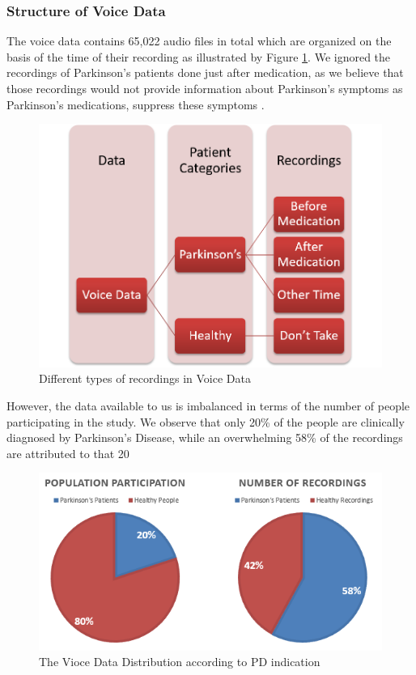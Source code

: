 \subsubsection{Structure of Voice Data}
The voice data contains 65,022 audio files in total which are organized on the basis of the time of their recording as illustrated by Figure \ref{fig:park_time}. We ignored the recordings of Parkinson's patients done just after medication, as we believe that those recordings would not provide information about Parkinson's symptoms as Parkinson's medications, suppress these symptoms \cite{schwab2018phonemd}.
\begin{figure}[htbp]
  \centering
  \includegraphics[width=\textwidth]{./Figures/park_time.png}
  \caption{Different types of recordings in Voice Data}
  \label{fig:park_time}
\end{figure}

However, the data available to us is imbalanced in terms of the number of people participating in the study. We observe that only 20\% of the people are clinically diagnosed by Parkinson's Disease, while an overwhelming 58\% of the recordings are attributed to that 20\ %
\begin{figure}[htbp]
  \centering
  \includegraphics[width=\textwidth]{./Figures/park_dist.png}
  \caption{The Vioce Data Distribution according to PD indication}
  \label{fig:park_dist}
\end{figure}
